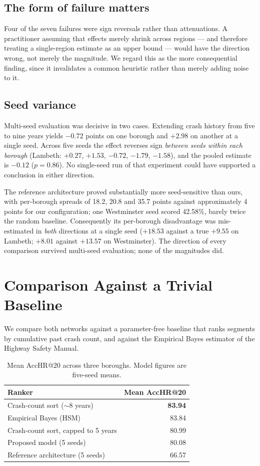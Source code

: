 \documentclass[conference]{IEEEtran}
\begin{document}
\subsection{The form of failure matters}

Four of the seven failures were sign reversals rather than attenuations. A
practitioner assuming that effects merely shrink across regions --- and
therefore treating a single-region estimate as an upper bound --- would
have the direction wrong, not merely the magnitude. We regard this as the
more consequential finding, since it invalidates a common heuristic rather
than merely adding noise to it.

\subsection{Seed variance}

Multi-seed evaluation was decisive in two cases. Extending crash history
from five to nine years yields $-0.72$ points on one borough and $+2.98$
on another at a single seed. Across five seeds the effect reverses sign
\emph{between seeds within each borough} (Lambeth: $+0.27$, $+1.53$,
$-0.72$, $-1.79$, $-1.58$), and the pooled estimate is $-0.12$
($p=0.86$). No single-seed run of that experiment could have supported a
conclusion in either direction.

The reference architecture proved substantially more seed-sensitive than
ours, with per-borough spreads of 18.2, 20.8 and 35.7 points against
approximately 4 points for our configuration; one Westminster seed scored
42.58\%, barely twice the random baseline. Consequently its per-borough
disadvantage was mis-estimated in \emph{both} directions at a single seed
($+18.53$ against a true $+9.55$ on Lambeth; $+8.01$ against $+13.57$ on
Westminster). The direction of every comparison survived multi-seed
evaluation; none of the magnitudes did.

\section{Comparison Against a Trivial Baseline}
\label{sec:baseline}

We compare both networks against a parameter-free baseline that ranks
segments by cumulative past crash count, and against the Empirical Bayes
estimator of the Highway Safety Manual.

\begin{table}[t]
\caption{Mean AccHR@20 across three boroughs. Model figures are five-seed
means.}
\label{tab:baseline}
\centering
\small
\begin{tabular}{lr}
\toprule
Ranker & Mean AccHR@20 \\
\midrule
Crash-count sort ($\sim$8 years) & \textbf{83.94} \\
Empirical Bayes (HSM) & 83.84 \\
Crash-count sort, capped to 5 years & 80.99 \\
Proposed model (5 seeds) & 80.08 \\
Reference architecture (5 seeds) & 66.57 \\
\bottomrule
\end{tabular}
\end{table}
\end{document}
